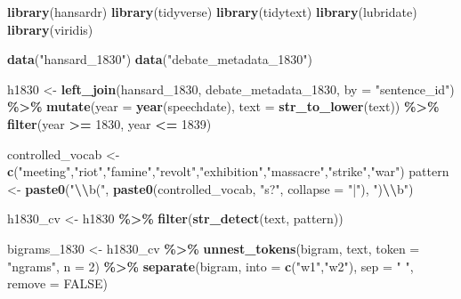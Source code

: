 \documentclass[
]{article}
\newenvironment{Shaded}{\begin{snugshade}}{\end{snugshade}}
\newcommand{\AttributeTok}[1]{\textcolor[rgb]{0.13,0.29,0.53}{#1}}
\newcommand{\ConstantTok}[1]{\textcolor[rgb]{0.56,0.35,0.01}{#1}}
\newcommand{\DecValTok}[1]{\textcolor[rgb]{0.00,0.00,0.81}{#1}}
\newcommand{\FunctionTok}[1]{\textcolor[rgb]{0.13,0.29,0.53}{\textbf{#1}}}
\newcommand{\NormalTok}[1]{#1}
\newcommand{\OtherTok}[1]{\textcolor[rgb]{0.56,0.35,0.01}{#1}}
\newcommand{\SpecialCharTok}[1]{\textcolor[rgb]{0.81,0.36,0.00}{\textbf{#1}}}
\newcommand{\StringTok}[1]{\textcolor[rgb]{0.31,0.60,0.02}{#1}}
\begin{document}
\begin{Shaded}
\begin{Highlighting}[]
\FunctionTok{library}\NormalTok{(hansardr)}
\FunctionTok{library}\NormalTok{(tidyverse)}
\FunctionTok{library}\NormalTok{(tidytext)}
\FunctionTok{library}\NormalTok{(lubridate)}
\FunctionTok{library}\NormalTok{(viridis)}

\FunctionTok{data}\NormalTok{(}\StringTok{"hansard\_1830"}\NormalTok{)}
\FunctionTok{data}\NormalTok{(}\StringTok{"debate\_metadata\_1830"}\NormalTok{)}

\NormalTok{h1830 }\OtherTok{\textless{}{-}} \FunctionTok{left\_join}\NormalTok{(hansard\_1830, debate\_metadata\_1830, }\AttributeTok{by =} \StringTok{"sentence\_id"}\NormalTok{) }\SpecialCharTok{\%\textgreater{}\%}
  \FunctionTok{mutate}\NormalTok{(}\AttributeTok{year =} \FunctionTok{year}\NormalTok{(speechdate),}
         \AttributeTok{text =} \FunctionTok{str\_to\_lower}\NormalTok{(text)) }\SpecialCharTok{\%\textgreater{}\%}
  \FunctionTok{filter}\NormalTok{(year }\SpecialCharTok{\textgreater{}=} \DecValTok{1830}\NormalTok{, year }\SpecialCharTok{\textless{}=} \DecValTok{1839}\NormalTok{)}

\NormalTok{controlled\_vocab }\OtherTok{\textless{}{-}} \FunctionTok{c}\NormalTok{(}\StringTok{"meeting"}\NormalTok{,}\StringTok{"riot"}\NormalTok{,}\StringTok{"famine"}\NormalTok{,}\StringTok{"revolt"}\NormalTok{,}\StringTok{"exhibition"}\NormalTok{,}\StringTok{"massacre"}\NormalTok{,}\StringTok{"strike"}\NormalTok{,}\StringTok{"war"}\NormalTok{)}
\NormalTok{pattern }\OtherTok{\textless{}{-}} \FunctionTok{paste0}\NormalTok{(}\StringTok{"}\SpecialCharTok{\textbackslash{}\textbackslash{}}\StringTok{b("}\NormalTok{, }\FunctionTok{paste0}\NormalTok{(controlled\_vocab, }\StringTok{"s?"}\NormalTok{, }\AttributeTok{collapse =} \StringTok{"|"}\NormalTok{), }\StringTok{")}\SpecialCharTok{\textbackslash{}\textbackslash{}}\StringTok{b"}\NormalTok{)}

\NormalTok{h1830\_cv }\OtherTok{\textless{}{-}}\NormalTok{ h1830 }\SpecialCharTok{\%\textgreater{}\%} \FunctionTok{filter}\NormalTok{(}\FunctionTok{str\_detect}\NormalTok{(text, pattern))}

\NormalTok{bigrams\_1830 }\OtherTok{\textless{}{-}}\NormalTok{ h1830\_cv }\SpecialCharTok{\%\textgreater{}\%}
  \FunctionTok{unnest\_tokens}\NormalTok{(bigram, text, }\AttributeTok{token =} \StringTok{"ngrams"}\NormalTok{, }\AttributeTok{n =} \DecValTok{2}\NormalTok{) }\SpecialCharTok{\%\textgreater{}\%}
  \FunctionTok{separate}\NormalTok{(bigram, }\AttributeTok{into =} \FunctionTok{c}\NormalTok{(}\StringTok{"w1"}\NormalTok{,}\StringTok{"w2"}\NormalTok{), }\AttributeTok{sep =} \StringTok{" "}\NormalTok{, }\AttributeTok{remove =} \ConstantTok{FALSE}\NormalTok{)}


\end{Highlighting}
\end{Shaded}
\end{document}
